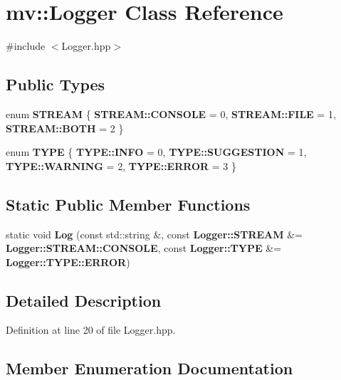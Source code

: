 \section{mv\+:\+:Logger Class Reference}
\label{classmv_1_1_logger}


{\ttfamily \#include $<$Logger.\+hpp$>$}

\subsection*{Public Types}
\begin{DoxyCompactItemize}
\item 
enum \textbf{ S\+T\+R\+E\+AM} \{ \textbf{ S\+T\+R\+E\+A\+M\+::\+C\+O\+N\+S\+O\+LE} = 0, 
\textbf{ S\+T\+R\+E\+A\+M\+::\+F\+I\+LE} = 1, 
\textbf{ S\+T\+R\+E\+A\+M\+::\+B\+O\+TH} = 2
 \}
\item 
enum \textbf{ T\+Y\+PE} \{ \textbf{ T\+Y\+P\+E\+::\+I\+N\+FO} = 0, 
\textbf{ T\+Y\+P\+E\+::\+S\+U\+G\+G\+E\+S\+T\+I\+ON} = 1, 
\textbf{ T\+Y\+P\+E\+::\+W\+A\+R\+N\+I\+NG} = 2, 
\textbf{ T\+Y\+P\+E\+::\+E\+R\+R\+OR} = 3
 \}
\end{DoxyCompactItemize}
\subsection*{Static Public Member Functions}
\begin{DoxyCompactItemize}
\item 
static void \textbf{ Log} (const std\+::string \&, const \textbf{ Logger\+::\+S\+T\+R\+E\+AM} \&=\textbf{ Logger\+::\+S\+T\+R\+E\+A\+M\+::\+C\+O\+N\+S\+O\+LE}, const \textbf{ Logger\+::\+T\+Y\+PE} \&=\textbf{ Logger\+::\+T\+Y\+P\+E\+::\+E\+R\+R\+OR})
\end{DoxyCompactItemize}


\subsection{Detailed Description}


Definition at line 20 of file Logger.\+hpp.



\subsection{Member Enumeration Documentation}
\mbox{\label{classmv_1_1_logger_ad1faa46e6c5ea053f88c2f35ef0a5687}} 
